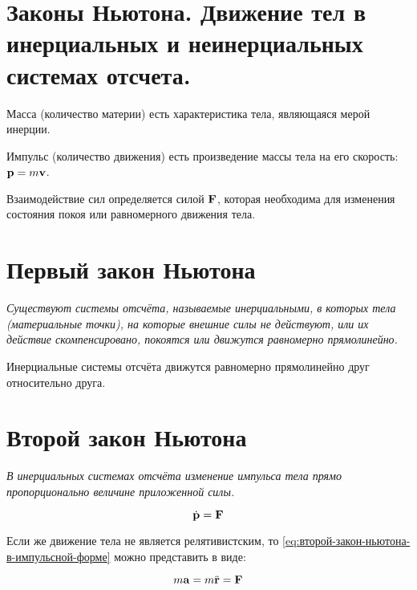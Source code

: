 \section{Законы Ньютона. Движение тел в инерциальных и неинерциальных системах отсчета.}

\begin{definition}
    Масса (количество материи) есть характеристика тела, являющаяся мерой инерции.
\end{definition}

\begin{definition}
    Импульс (количество движения) есть произведение массы тела на его скорость: $\mathbf p = m \mathbf v$.
\end{definition}

\begin{definition}
    Взаимодействие сил определяется силой $\mathbf F$, которая необходима для изменения состояния покоя или равномерного движения тела.
\end{definition}

\section*{Первый закон Ньютона}

\textit{Существуют системы отсчёта, называемые инерциальными, в которых тела (материальные точки), на которые внешние силы не действуют, или их действие скомпенсировано, покоятся или движутся равномерно прямолинейно.}

\begin{note}
    Инерциальные системы отсчёта движутся равномерно прямолинейно друг относительно друга.
\end{note}

\section*{Второй закон Ньютона}

\textit{В инерциальных системах отсчёта изменение импульса тела прямо пропорционально величине приложенной силы.}

\begin{equation} \label{eq:второй-закон-ньютона-в-импульсной-форме}
    \dot{\mathbf p} = \mathbf F
\end{equation}

Если же движение тела не является релятивистским, то \eqref{eq:второй-закон-ньютона-в-импульсной-форме} можно представить в виде:

\begin{equation} \label{eq:второй-закон-ньютона}
    m \mathbf a = m \ddot{\mathbf r} = \mathbf F
\end{equation}

